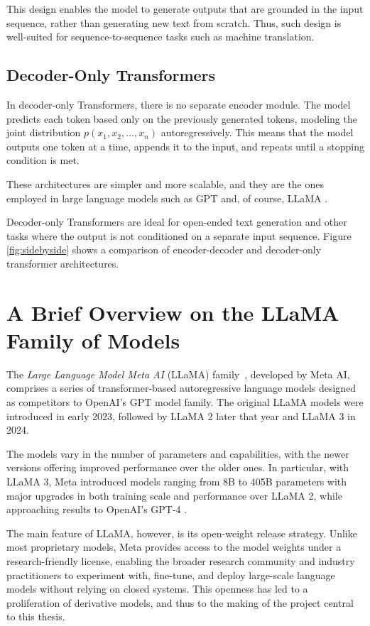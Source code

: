 This design enables the model to generate outputs that are grounded in the input sequence, rather than generating new text from scratch. Thus, such design is well-suited for sequence-to-sequence tasks such as machine translation.

\subsection{Decoder-Only Transformers}

In decoder-only Transformers, there is no separate encoder module. The model predicts each token based only on the previously generated tokens, modeling the joint distribution \( p(x_1, x_2, \ldots, x_n) \) autoregressively. This means that the model outputs one token at a time, appends it to the input, and repeats until a stopping condition is met.

These architectures are simpler and more scalable, and they are the ones employed in large language models such as GPT \cite{gpt} and, of course, LLaMA \cite{llama}.

Decoder-only Transformers are ideal for open-ended text generation and other tasks where the output is not conditioned on a separate input sequence.
Figure \ref{fig:sidebyside} shows a comparison of encoder-decoder and decoder-only transformer architectures.

\section{A Brief Overview on the LLaMA Family of Models} \label{llama_overview}

The \textit{Large Language Model Meta AI} (LLaMA) family~\cite{llama}, developed by Meta AI, comprises a series of transformer-based autoregressive language models designed as competitors to OpenAI's GPT model family. The original LLaMA models were introduced in early 2023, followed by LLaMA 2 \cite{llama2} later that year and LLaMA 3 \cite{llama3} in 2024.

The models vary in the number of parameters and capabilities, with the newer versions offering improved performance over the older ones. In particular, with LLaMA 3, Meta introduced models ranging from 8B to 405B parameters with major upgrades in both training scale and performance over LLaMA 2, while approaching results to OpenAI's GPT-4 \cite{gpt4} \cite{llama3}.

The main feature of LLaMA, however, is its open-weight release strategy. Unlike most proprietary models, Meta provides access to the model weights under a research-friendly license, enabling the broader research community and industry practitioners to experiment with, fine-tune, and deploy large-scale language models without relying on closed systems. This openness has led to a proliferation of derivative models, and thus to the making of the project central to this thesis.


